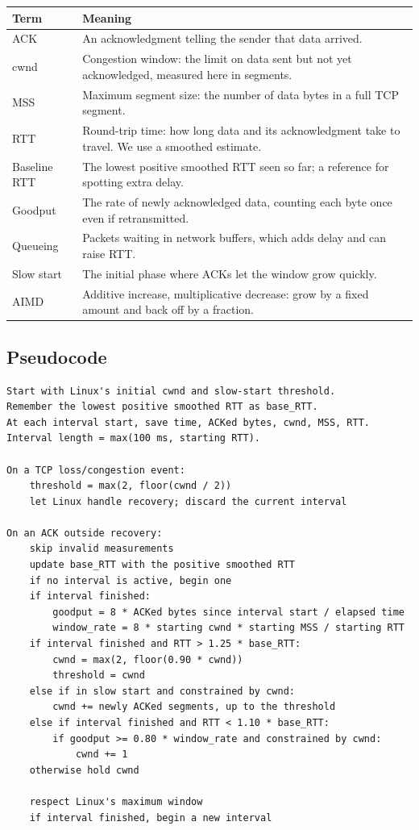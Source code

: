 \documentclass[11pt]{article}
\begin{document}
\begingroup
\small
\renewcommand{\arraystretch}{1.12}
\begin{tabularx}{\linewidth}{@{}lX@{}}
\toprule
Term & Meaning \\
\midrule
ACK & An acknowledgment telling the sender that data arrived. \\
cwnd & Congestion window: the limit on data sent but not yet acknowledged, measured here in segments. \\
MSS & Maximum segment size: the number of data bytes in a full TCP segment. \\
RTT & Round-trip time: how long data and its acknowledgment take to travel. We use a smoothed estimate. \\
Baseline RTT & The lowest positive smoothed RTT seen so far; a reference for spotting extra delay. \\
Goodput & The rate of newly acknowledged data, counting each byte once even if retransmitted. \\
Queueing & Packets waiting in network buffers, which adds delay and can raise RTT. \\
Slow start & The initial phase where ACKs let the window grow quickly. \\
AIMD & Additive increase, multiplicative decrease: grow by a fixed amount and back off by a fraction. \\
\bottomrule
\end{tabularx}
\endgroup

\newpage
\begingroup
\small
\setlength{\parskip}{0.3em}
\lstset{basicstyle=\ttfamily\footnotesize}
\subsection*{Pseudocode}

\begin{lstlisting}
Start with Linux's initial cwnd and slow-start threshold.
Remember the lowest positive smoothed RTT as base_RTT.
At each interval start, save time, ACKed bytes, cwnd, MSS, RTT.
Interval length = max(100 ms, starting RTT).

On a TCP loss/congestion event:
    threshold = max(2, floor(cwnd / 2))
    let Linux handle recovery; discard the current interval

On an ACK outside recovery:
    skip invalid measurements
    update base_RTT with the positive smoothed RTT
    if no interval is active, begin one
    if interval finished:
        goodput = 8 * ACKed bytes since interval start / elapsed time
        window_rate = 8 * starting cwnd * starting MSS / starting RTT
    if interval finished and RTT > 1.25 * base_RTT:
        cwnd = max(2, floor(0.90 * cwnd))
        threshold = cwnd
    else if in slow start and constrained by cwnd:
        cwnd += newly ACKed segments, up to the threshold
    else if interval finished and RTT < 1.10 * base_RTT:
        if goodput >= 0.80 * window_rate and constrained by cwnd:
            cwnd += 1
    otherwise hold cwnd

    respect Linux's maximum window
    if interval finished, begin a new interval
\end{lstlisting}
\end{document}
